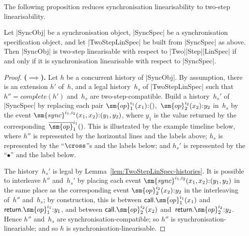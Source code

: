 The following proposition reduces synchronisation linearisability to two-step
linearisability.
%
\begin{prop}
Let |SyncObj| be a synchronisation object, |SyncSpec| be a synchronisation
specification object, and let |TwoStepLinSpec| be built from |SyncSpec| as
above.  Then |SyncObj| is two-step linearisable with respect to
|Two|\-|Step|\-|LinSpec| if and only if it is synchronisation linearisable
with respect to |SyncSpec|.
\end{prop}
\begin{proof}
\textbf{($\implies$).}\quad
%
Let $h$ be a concurrent history of |SyncObj|.  By assumption, there is an
extension $h'$ of~$h$, and a legal history~$h_s$ of |TwoStepLinSpec| such that
$h'' = complete(h')$ and~$h_s$ are two-step-compatible.
%
Build a history~$h_s'$ of |SyncSpec| by replacing each pair
$\sm{op}_1^{i_1}(x_1) \:: ()$,\, $\sm{op}_2^{i_2}(x_2) \:: y_2$ in~$h_s$ by
the event $\sm{sync}^{i_1,i_2}(x_1,x_2) \:: (y_1,y_2)$, where $y_1$ is the
value returned by the corresponding~$\overline{\sm{op}}_1^{i_1}()$.
%
This is illustrated by the example timeline below, where $h''$ is represented
by the horizontal lines and the labels above; $h_s$ is represented by the
``$\cross$''s and the labels below; and $h_s'$ is represented by the
``$\bullet$'' and the label below.
%
\begin{center}
\end{center}

The history~$h_s'$ is legal by Lemma~\ref{lem:TwoStepLinSpec-histories}.  
%
It is possible to interleave $h''$ and~$h_s'$ by placing each event
$\sm{sync}^{i_1,i_2}(x_1,x_2) \:: (y_1,y_2)$ in the same place as the
corresponding event $\sm{op}_2^{i_2}(x_2) \:: y_2$ in the interleaving
of~$h''$ and~$h_s$; by construction, this is between
$\call.\sm{op}_1^{i_1}(x_1)$ and~$\return.\sm{op}_1^{i_1} \:: y_1$, and
between $\call.\sm{op}_2^{i_2}(x_2)$ and~$\return.\sm{op}_2^{i_2} \:: y_2$.
%
Hence $h''$ and~$h_s$ are synchronisation-compatible; so $h''$ is
synchronisation-lineariable; and so $h$ is synchronisation-linearisable.


\end{proof}
